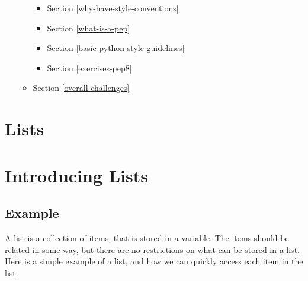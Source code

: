 \documentclass[11pt]{article}
\providecommand{\tightlist}{%
      \setlength{\itemsep}{0pt}\setlength{\parskip}{0pt}}
\begin{document}
\begin{itemize}
\begin{itemize}
    \begin{itemize}
    \tightlist
    \item
      Section \ref{why-have-style-conventions}
    \item
      Section \ref{what-is-a-pep}
    \item
      Section \ref{basic-python-style-guidelines}
    \item
      Section \ref{exercises-pep8}
    \end{itemize}
  \item
    Section \ref{overall-challenges}
  \end{itemize}
\end{itemize}

    \hypertarget{lists}{%
\section{Lists}\label{lists}}

    \hypertarget{introducing-lists}{%
\section{Introducing Lists}\label{introducing-lists}}

\hypertarget{example}{%
\subsection{Example}\label{example}}

A list is a collection of items, that is stored in a variable. The items
should be related in some way, but there are no restrictions on what can
be stored in a list. Here is a simple example of a list, and how we can
quickly access each item in the list.
\end{document}
